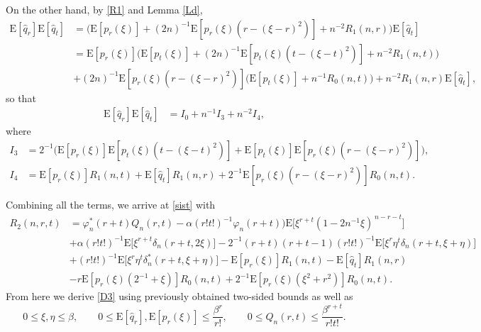 \documentclass[12]{article}
\newcommand{\rE}{\mathrm{E}} %
\newcommand{\rC}{\mathrm{Cov}} %
\begin{document}
On the other hand,  by \eqref{R1} and Lemma \ref{Ld},
\begin{align*}
\rE[\hat q_r]\rE[\hat q_t]&=\Big(\rE[p_{r}(\xi)]+(2n)^{-1}\rE[p_{r}(\xi)(r-(\xi-r)^2)]+n^{-2}R_1(n,r)\Big)\rE[\hat q_t]\\
&=\rE[p_{r}(\xi)]\Big(\rE[p_{t}(\xi)]+(2n)^{-1}\rE[p_{t}(\xi)(t-(\xi-t)^2)]+n^{-2}R_1(n,t)\Big)\\
&+(2n)^{-1}\rE[p_{r}(\xi)(r-(\xi-r)^2)]\Big(\rE[p_{t}(\xi)]+n^{-1}R_0(n,t)\Big)+n^{-2}R_1(n,r)\rE[\hat q_t],
\end{align*}
so that
\begin{align*}
\rE[\hat q_r]\rE[\hat q_t]&=I_0+n^{-1}I_3+n^{-2}I_4, 
\end{align*}
where
\begin{align*}
I_{3}&=2^{-1}\Big(\rE[p_{r}(\xi)]\rE[p_{t}(\xi)(t-(\xi-t)^2)]+\rE[p_{t}(\xi)]\rE[p_{r}(\xi)(r-(\xi-r)^2)]\Big), \\
I_{4}&=\rE[p_{r}(\xi)]R_1(n,t)+\rE[\hat q_t]R_1(n,r)+2^{-1}\rE[p_{r}(\xi)(r-(\xi-r)^2)]R_0(n,t).
\end{align*}

%

Combining all the terms, we arrive at \eqref{sist} with
\begin{align*}
R_2(n,r,t)&=\varphi^*_n(r+t)Q_n(r,t)-\alpha (r!t!)^{-1}\varphi_n(r+t))\rE\Big[\xi^{r+t}(1-2n^{-1}\xi)^{\,n-r-t}\Big]\\
&+\alpha (r!t!)^{-1}\rE\Big[\xi^{r+t}\delta_n(r+t, 2\xi)\Big]-2^{-1}(r+t)(r+t-1)(r! t!)^{-1}\rE\Big[\xi^r\eta^t\delta_n(r+t,\xi+\eta)\Big]\\
&+ (r!t!)^{-1}\rE\Big[\xi^r\eta^t \delta_n^*(r+t,\xi+\eta)\Big]-\rE[p_{r}(\xi)]R_1(n,t)-\rE[\hat q_t]R_1(n,r)\\
&-r\rE[p_{r}(\xi)(2^{-1}+\xi)]R_0(n,t)+2^{-1}\rE[p_{r}(\xi)(\xi^2+r^2)]R_0(n,t).
\end{align*}
From here we derive \eqref{D3} using previously obtained two-sided bounds as well as
\[0\le\xi,\eta\le\beta,\qquad 0\le \rE[\hat q_r], \rE[p_r(\xi)]\le \frac{\beta^r}{r!},\qquad 0\le Q_n(r,t)\le \frac{\beta^{r+t}}{r!t!}.\]
\end{document}
